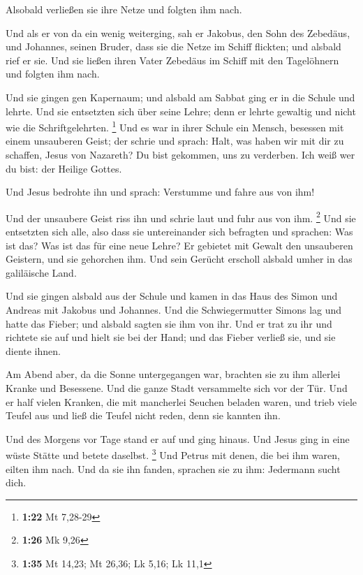  Alsobald verließen sie ihre Netze und folgten ihm nach.

 Und als er von da ein wenig weiterging, sah er Jakobus,
den Sohn des Zebedäus, und Johannes, seinen Bruder, dass sie die Netze
im Schiff flickten; und alsbald rief er sie.  Und sie
ließen ihren Vater Zebedäus im Schiff mit den Tagelöhnern und folgten
ihm nach.

 Und sie gingen gen Kapernaum; und alsbald am Sabbat ging
er in die Schule und lehrte.  Und sie entsetzten sich
über seine Lehre; denn er lehrte gewaltig und nicht wie die
Schriftgelehrten. \footnote{\textbf{1:22} Mt 7,28-29} 
Und es war in ihrer Schule ein Mensch, besessen mit einem unsauberen
Geist; der schrie  und sprach: Halt, was haben wir mit
dir zu schaffen, Jesus von Nazareth? Du bist gekommen, uns zu verderben.
Ich weiß wer du bist: der Heilige Gottes.

 Und Jesus bedrohte ihn und sprach: Verstumme und fahre
aus von ihm!

 Und der unsaubere Geist riss ihn und schrie laut und
fuhr aus von ihm. \footnote{\textbf{1:26} Mk 9,26}  Und
sie entsetzten sich alle, also dass sie untereinander sich befragten und
sprachen: Was ist das? Was ist das für eine neue Lehre? Er gebietet mit
Gewalt den unsauberen Geistern, und sie gehorchen ihm. 
Und sein Gerücht erscholl alsbald umher in das galiläische Land.

 Und sie gingen alsbald aus der Schule und kamen in das
Haus des Simon und Andreas mit Jakobus und Johannes.  Und
die Schwiegermutter Simons lag und hatte das Fieber; und alsbald sagten
sie ihm von ihr.  Und er trat zu ihr und richtete sie auf
und hielt sie bei der Hand; und das Fieber verließ sie, und sie diente
ihnen.

 Am Abend aber, da die Sonne untergegangen war, brachten
sie zu ihm allerlei Kranke und Besessene.  Und die ganze
Stadt versammelte sich vor der Tür.  Und er half vielen
Kranken, die mit mancherlei Seuchen beladen waren, und trieb viele
Teufel aus und ließ die Teufel nicht reden, denn sie kannten ihn.

 Und des Morgens vor Tage stand er auf und ging hinaus.
Und Jesus ging in eine wüste Stätte und betete daselbst. \footnote{\textbf{1:35}
  Mt 14,23; Mt 26,36; Lk 5,16; Lk 11,1}  Und Petrus mit
denen, die bei ihm waren, eilten ihm nach.  Und da sie
ihn fanden, sprachen sie zu ihm: Jedermann sucht dich.

